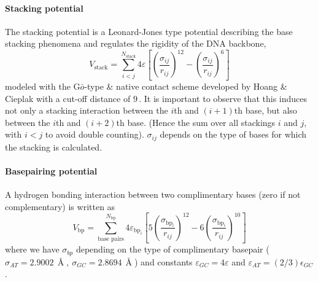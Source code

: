 \paragraph{Stacking potential} The stacking potential is a Leonard-Jones type potential describing the base stacking phenomena and regulates the rigidity of the DNA backbone,
\begin{equation}
V_\text{stack} =  \sum_{i<j}^{N_\text{stack}} 4\varepsilon \left[ \left(\frac{\sigma_{ij}}{r_{ij}} \right)^{12} - \left(\frac{\sigma_{ij}}{r_{ij}} \right)^{6} \right]
\end{equation}
modeled with the G$\bar{o}$-type \& native contact scheme developed by Hoang \& Cieplak \cite{hoangcieplak} with a cut-off distance of $9$\,\Angstrom. It is important to observe that this induces not only a stacking interaction between the $i$th and $(i+1)$th base, but also between the $i$th and $(i+2)$th base. (Hence the sum over all stackings $i$ and $j$, with $i < j$ to avoid double counting). $\sigma_{ij}$ depends on the type of bases for which the stacking is calculated.

\paragraph{Basepairing potential} A hydrogen bonding interaction between two complimentary bases (zero if not complementary) is written as
\begin{equation}
V_\text{bp} =  \sum_{\text{base pairs}}^{N_\text{bp}} 4\varepsilon_{\text{bp}_i} \left[ 5\left(\frac{\sigma_{\text{bp}_i}}{r_{ij}} \right)^{12} - 6\left(\frac{\sigma_{\text{bp}_i}}{r_{ij}} \right)^{10} \right]
\end{equation}
where we have $\sigma_{bp}$ depending on the type of complimentary basepair ($\sigma_{AT} = 2.9002\,\Angstrom,\ \sigma_{GC} = 2.8694\,\Angstrom$) and constants $\varepsilon_{GC} = 4\varepsilon$ and $\varepsilon_{AT} = (2/3)\epsilon_{GC}$.

